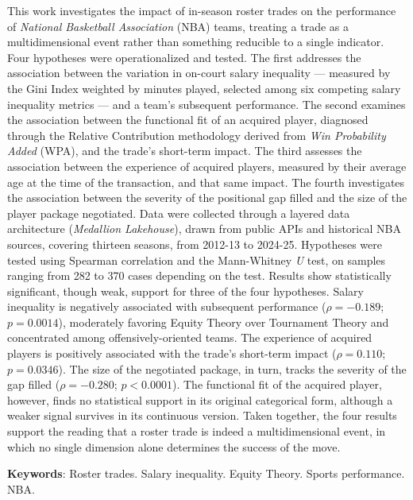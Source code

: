 \noindent This work investigates the impact of in-season roster trades on the performance of \textit{National Basketball Association} (NBA) teams, treating a trade as a multidimensional event rather than something reducible to a single indicator. Four hypotheses were operationalized and tested. The first addresses the association between the variation in on-court salary inequality — measured by the Gini Index weighted by minutes played, selected among six competing salary inequality metrics — and a team's subsequent performance. The second examines the association between the functional fit of an acquired player, diagnosed through the Relative Contribution methodology derived from \textit{Win Probability Added} (WPA), and the trade's short-term impact. The third assesses the association between the experience of acquired players, measured by their average age at the time of the transaction, and that same impact. The fourth investigates the association between the severity of the positional gap filled and the size of the player package negotiated. Data were collected through a layered data architecture (\textit{Medallion Lakehouse}), drawn from public APIs and historical NBA sources, covering thirteen seasons, from 2012-13 to 2024-25. Hypotheses were tested using Spearman correlation and the Mann-Whitney \textit{U} test, on samples ranging from 282 to 370 cases depending on the test. Results show statistically significant, though weak, support for three of the four hypotheses. Salary inequality is negatively associated with subsequent performance ($\rho = -0.189$; $p = 0.0014$), moderately favoring Equity Theory over Tournament Theory and concentrated among offensively-oriented teams. The experience of acquired players is positively associated with the trade's short-term impact ($\rho = 0.110$; $p = 0.0346$). The size of the negotiated package, in turn, tracks the severity of the gap filled ($\rho = -0.280$; $p < 0.0001$). The functional fit of the acquired player, however, finds no statistical support in its original categorical form, although a weaker signal survives in its continuous version. Taken together, the four results support the reading that a roster trade is indeed a multidimensional event, in which no single dimension alone determines the success of the move.

\vspace{0.5cm}
\noindent\textbf{Keywords}: Roster trades. Salary inequality. Equity Theory. Sports performance. NBA.

